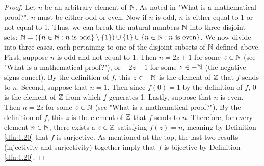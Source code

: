 \documentclass[../main.tex]{subfiles}
\begin{document}
\begin{exercise}
\begin{proof}
        Let $n$ be an arbitrary element of $\mathbb{N}$. As noted in "What is a mathematical proof?", $n$ must be either odd or even. Now if $n$ is odd, $n$ is either equal to 1 or not equal to 1. Thus, we can break the natural numbers $\mathbb{N}$ into three disjoint sets: $\mathbb{N}=(\{n\in\mathbb{N}:n\text{ is odd}\}\setminus\{1\})\cup\{1\}\cup\{n\in\mathbb{N}:n\text{ is even}\}$. We now divide into three cases, each pertaining to one of the disjoint subsets of $\mathbb{N}$ defined above. First, suppose $n$ is odd and not equal to 1. Then $n=2z+1$ for some $z\in\mathbb{N}$ (see "What is a mathematical proof?"), or $-2z+1$ for some $z\in-\mathbb{N}$ (the negative signs cancel). By the definition of $f$, this $z\in-\mathbb{N}$ is the element of $\mathbb{Z}$ that $f$ sends to $n$. Second, suppose that $n=1$. Then since $f(0)=1$ by the definition of $f$, 0 is the element of $\mathbb{Z}$ from which $f$ generates 1. Lastly, suppose that $n$ is even. Then $n=2z$ for some $z\in\mathbb{N}$ (see "What is a mathematical proof?"). By the definition of $f$, this $z$ is the element of $\mathbb{Z}$ that $f$ sends to $n$. Therefore, for every element $n\in\mathbb{N}$, there exists a $z\in\mathbb{Z}$ satisfying $f(z)=n$, meaning by Definition \ref{dfn:1.20} that $f$ is surjective. As mentioned at the top, the last two results (injectivity and surjectivity) together imply that $f$ is bijective by Definition \ref{dfn:1.20}.
    \end{proof}
\end{exercise}
\end{document}
